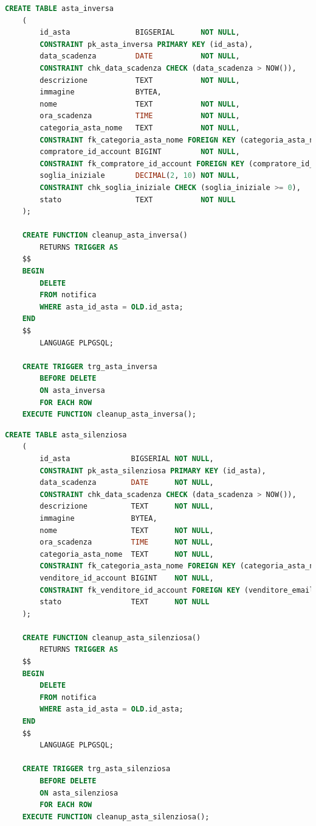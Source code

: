 \begin{lstlisting}[language=SQL, caption=Relazione asta inversa]
    CREATE TABLE asta_inversa
    (
        id_asta               BIGSERIAL      NOT NULL,
        CONSTRAINT pk_asta_inversa PRIMARY KEY (id_asta),
        data_scadenza         DATE           NOT NULL,
        CONSTRAINT chk_data_scadenza CHECK (data_scadenza > NOW()),
        descrizione           TEXT           NOT NULL,
        immagine              BYTEA,
        nome                  TEXT           NOT NULL,
        ora_scadenza          TIME           NOT NULL,
        categoria_asta_nome   TEXT           NOT NULL,
        CONSTRAINT fk_categoria_asta_nome FOREIGN KEY (categoria_asta_nome) REFERENCES categoria_asta (nome) ON UPDATE CASCADE ON DELETE CASCADE,
        compratore_id_account BIGINT         NOT NULL,
        CONSTRAINT fk_compratore_id_account FOREIGN KEY (compratore_id_account) REFERENCES compratore (id_account) ON UPDATE CASCADE ON DELETE CASCADE,
        soglia_iniziale       DECIMAL(2, 10) NOT NULL,
        CONSTRAINT chk_soglia_iniziale CHECK (soglia_iniziale >= 0),
        stato                 TEXT           NOT NULL
    );
    
    CREATE FUNCTION cleanup_asta_inversa()
        RETURNS TRIGGER AS
    $$
    BEGIN
        DELETE
        FROM notifica
        WHERE asta_id_asta = OLD.id_asta;
    END
    $$
        LANGUAGE PLPGSQL;
    
    CREATE TRIGGER trg_asta_inversa
        BEFORE DELETE
        ON asta_inversa
        FOR EACH ROW
    EXECUTE FUNCTION cleanup_asta_inversa();
\end{lstlisting}

\begin{lstlisting}[language=SQL, caption=Relazione asta silenziosa]
    CREATE TABLE asta_silenziosa
    (
        id_asta              BIGSERIAL NOT NULL,
        CONSTRAINT pk_asta_silenziosa PRIMARY KEY (id_asta),
        data_scadenza        DATE      NOT NULL,
        CONSTRAINT chk_data_scadenza CHECK (data_scadenza > NOW()),
        descrizione          TEXT      NOT NULL,
        immagine             BYTEA,
        nome                 TEXT      NOT NULL,
        ora_scadenza         TIME      NOT NULL,
        categoria_asta_nome  TEXT      NOT NULL,
        CONSTRAINT fk_categoria_asta_nome FOREIGN KEY (categoria_asta_nome) REFERENCES categoria_asta (nome) ON UPDATE CASCADE ON DELETE CASCADE,
        venditore_id_account BIGINT    NOT NULL,
        CONSTRAINT fk_venditore_id_account FOREIGN KEY (venditore_email) REFERENCES venditore (id_account) ON UPDATE CASCADE ON DELETE CASCADE,
        stato                TEXT      NOT NULL
    );
    
    CREATE FUNCTION cleanup_asta_silenziosa()
        RETURNS TRIGGER AS
    $$
    BEGIN
        DELETE
        FROM notifica
        WHERE asta_id_asta = OLD.id_asta;
    END
    $$
        LANGUAGE PLPGSQL;
    
    CREATE TRIGGER trg_asta_silenziosa
        BEFORE DELETE
        ON asta_silenziosa
        FOR EACH ROW
    EXECUTE FUNCTION cleanup_asta_silenziosa();
\end{lstlisting}

